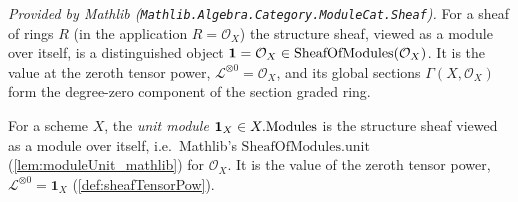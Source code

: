 \begin{lemma}
  \label{lem:moduleUnit_mathlib}
  \mathlibok
  \textit{Provided by Mathlib
  (\texttt{Mathlib.Algebra.Category.ModuleCat.Sheaf}).}
  For a sheaf of rings \(R\) (in the application \(R = \mathcal{O}_X\)) the
  structure sheaf, viewed as a module over itself, is a distinguished object
  \(\mathbf{1} = \mathcal{O}_X \in \mathrm{SheafOfModules}(\mathcal{O}_X)\). It is the value at
  the zeroth tensor power, \(\mathcal{L}^{\otimes 0} = \mathcal{O}_X\), and its
  global sections \(\Gamma(X, \mathcal{O}_X)\) form the degree-zero component of
  the section graded ring.
\end{lemma}


\begin{definition}\leanok
  \label{def:unitModule}
  For a scheme \(X\), the \emph{unit module} \(\mathbf{1}_X \in X.\mathrm{Modules}\) is the
  structure sheaf viewed as a module over itself, i.e.\ Mathlib's
  \(\mathrm{SheafOfModules.unit}\) (\cref{lem:moduleUnit_mathlib}) for
  \(\mathcal{O}_X\). It is the value of the zeroth tensor power,
  \(\mathcal{L}^{\otimes 0} = \mathbf{1}_X\) (\cref{def:sheafTensorPow}).
\end{definition}

